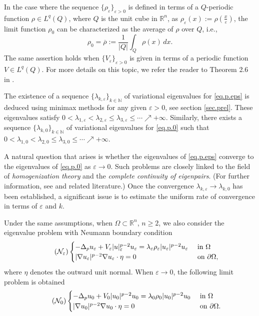 \documentclass[12pt]{amsart}
\theoremstyle{definition}
\theoremstyle{remark}
\numberwithin{equation}{section}
\begin{document}
In the case where the sequence $\{\rho_\varepsilon\}_{\varepsilon>0}$ is defined in terms of a $Q$-periodic function $\rho\in L^q(Q)$, where $Q$ is the unit cube in $\mathbb R^n$, as $\rho_\varepsilon(x):=\rho\left(\frac{x}{\varepsilon}\right)$, the limit function $\rho_0$ can be characterized as the average of $\rho$ over $Q$, i.e.,
$$
\rho_0=\overline\rho :=\frac{1}{|Q|}\int_Q \rho(x)\,dx.
$$
The same assertion holds when $\{V_\varepsilon\}_{\varepsilon>0}$ is given in terms of a periodic function $V\in L^q(Q)$. For more details on this topic, we refer the reader to Theorem 2.6 in \cite{CD}.


The existence of a sequence $\{\lambda_{k,\varepsilon}\}_{k\in\mathbb N}$ of variational eigenvalues for \eqref{eq.p.eps} is deduced using minimax methods for any given $\varepsilon>0$, see section \ref{sec.prel}. These eigenvalues satisfy $0<\lambda_{1,\varepsilon}<\lambda_{2,\varepsilon}\leq \lambda_{3,\varepsilon}\leq \cdots \nearrow +\infty$. Similarly, there exists a sequence $\{\lambda_{k,0}\}_{k\in\mathbb N}$ of variational eigenvalues for \eqref{eq.p.0} such that $0<\lambda_{1,0}<\lambda_{2,0}\leq \lambda_{3,0}\leq \cdots \nearrow +\infty$.




A natural question that arises is whether the eigenvalues of \eqref{eq.p.eps} converge to the eigenvalues of \eqref{eq.p.0} as $\varepsilon\to 0$. Such problems are closely linked to the field of \emph{homogenization theory} and the \emph{complete continuity of eigenpairs}. (For further information, see \cite{A, LY, OSY} and related literature.) Once the convergence $\lambda_{k,\varepsilon} \to \lambda_{k,0}$ has been established, a significant issue is to estimate the uniform rate of convergence in terms of $\varepsilon$ and $k$.

Under the same assumptions, when $\Omega\subset \mathbb R^n$, $n\geq 2$, we also   consider the eigenvalue problem with Neumann boundary condition
\begin{align}\tag{$\mathcal{N}_\varepsilon$}   \label{eq.n.eps} 
\begin{cases}
-\Delta_p u_\varepsilon + V_\varepsilon |u|_\varepsilon^{p-2} u_\varepsilon= \lambda_\varepsilon \rho_\varepsilon |u_\varepsilon|^{p-2}u_\varepsilon &\text{ in } \Omega\\
|\nabla u_\varepsilon|^{p-2}\nabla u_\varepsilon \cdot \eta =0 & \text{ on } \partial\Omega,
\end{cases}
\end{align}
where $\eta$ denotes the outward unit normal. When $\varepsilon\to 0$,  the following limit problem is obtained
\begin{align}\tag{$\mathcal{N}_0$}   \label{eq.n.0} 
\begin{cases}
-\Delta_p u_0 +  V_0 |u_0|^{p-2}u_0 = \lambda_0 \rho_0 |u_0|^{p-2}u_0 &\text{ in } \Omega\\
|\nabla u_0|^{p-2}\nabla u_0 \cdot \eta =0 & \text{ on } \partial\Omega.
\end{cases}
\end{align}
\end{document}
